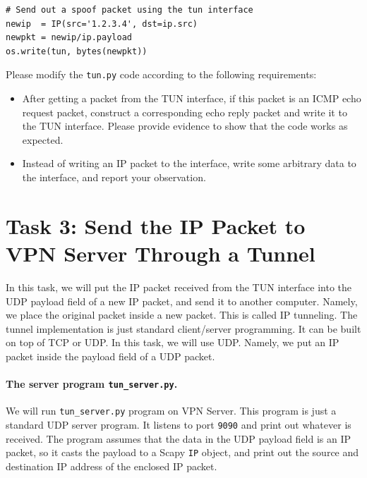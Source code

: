 \begin{lstlisting}
# Send out a spoof packet using the tun interface
newip  = IP(src='1.2.3.4', dst=ip.src)
newpkt = newip/ip.payload
os.write(tun, bytes(newpkt))
\end{lstlisting}

Please modify the \texttt{tun.py} code according to the following requirements:

\begin{itemize}
\item After getting a packet from the TUN interface, if this packet
is an ICMP echo request packet, construct a corresponding 
echo reply packet and write it to the TUN interface. Please provide
evidence to show that the code works as expected. 

\item Instead of writing an IP packet to the interface, write some arbitrary data to the 
interface, and report your observation. 
\end{itemize}
 




\section{Task 3: Send the IP Packet to VPN Server Through a Tunnel} 


In this task, we will put the IP packet received from the TUN interface
into the UDP payload field of a new IP packet, and send it to another computer. 
Namely, we place the original packet inside a new packet. This is called IP tunneling. 
The tunnel implementation is just standard client/server programming.
It can be built on top of TCP or UDP. In this task, we will use UDP.
Namely, we put an IP packet inside the payload field of a UDP packet. 


\paragraph{The server program \texttt{tun\_server.py}.}
We will run \texttt{tun\_server.py} program on VPN Server.
This program is just a standard UDP server program. It 
listens to port \texttt{9090} and print out whatever is 
received.  The program assumes that the data in the UDP payload 
field is an IP packet, so it 
casts the payload to a Scapy \texttt{IP} object, and print out 
the source and destination IP address of the enclosed IP packet. 


